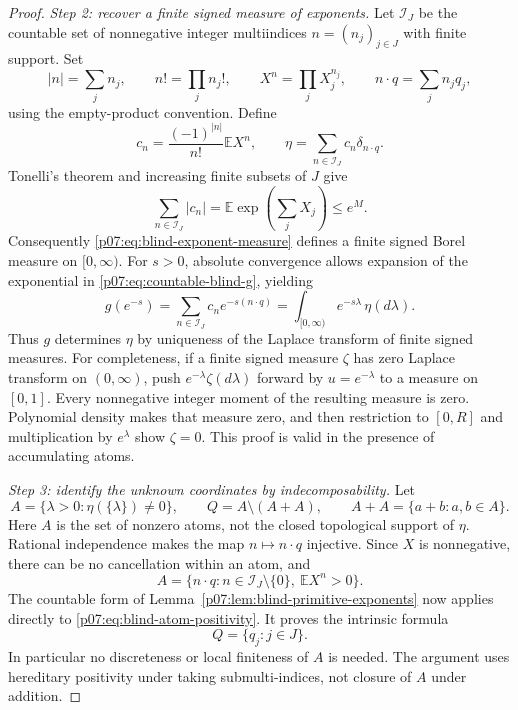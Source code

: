 \documentclass[11pt,letterpaper]{article}
\theoremstyle{definition}
\theoremstyle{remark}
\newcommand{\E}{\mathbb E}
\newcommand{\1}{\mathbf 1}
\begin{document}
\begin{proof}
\emph{Step 2: recover a finite signed measure of exponents.}
Let $\mathcal I_J$ be the countable set of nonnegative integer
multiindices $n=(n_j)_{j\in J}$ with finite support. Set
\[
 |n|=\sum_jn_j,\qquad n!=\prod_jn_j!,\qquad
 X^n=\prod_jX_j^{n_j},\qquad n\cdot q=\sum_jn_jq_j,
\]
using the empty-product convention. Define
\begin{equation}\label{p07:eq:blind-exponent-measure}
 c_n=\frac{(-1)^{|n|}}{n!}\E X^n,
 \qquad
 \eta=\sum_{n\in\mathcal I_J}c_n\delta_{n\cdot q}.
\end{equation}
Tonelli's theorem and increasing finite subsets of $J$ give
\begin{equation}\label{p07:eq:blind-exponent-variation}
 \sum_{n\in\mathcal I_J}|c_n|
   =\E\exp\left(\sum_jX_j\right)\leq e^M.
\end{equation}
Consequently \eqref{p07:eq:blind-exponent-measure} defines a finite signed
Borel measure on $[0,\infty)$. For $s>0$, absolute convergence allows
expansion of the exponential in \eqref{p07:eq:countable-blind-g}, yielding
\begin{equation}\label{p07:eq:blind-exponent-laplace}
 g(e^{-s})
   =\sum_{n\in\mathcal I_J}c_ne^{-s(n\cdot q)}
   =\int_{[0,\infty)}e^{-s\lambda}\,\eta(d\lambda).
\end{equation}
Thus $g$ determines $\eta$ by uniqueness of the Laplace transform of
finite signed measures. For completeness, if a finite signed measure
$\zeta$ has zero Laplace transform on $(0,\infty)$, push
$e^{-\lambda}\zeta(d\lambda)$ forward by $u=e^{-\lambda}$ to a
measure on $[0,1]$. Every nonnegative integer moment of the resulting
measure is zero. Polynomial density makes that measure zero, and then
restriction to $[0,R]$ and multiplication by $e^\lambda$ show
$\zeta=0$. This proof is valid in the presence of accumulating atoms.

\emph{Step 3: identify the unknown coordinates by indecomposability.}
Let
\begin{equation}\label{p07:eq:blind-atom-set}
 A=\{\lambda>0:\eta(\{\lambda\})\ne0\},
 \qquad
 Q=A\setminus(A+A),
 \qquad A+A=\{a+b:a,b\in A\}.
\end{equation}
Here $A$ is the set of nonzero atoms, not the closed topological support
of $\eta$. Rational independence makes the map $n\mapsto n\cdot q$
injective. Since $X$ is nonnegative, there can be no cancellation within
an atom, and
\begin{equation}\label{p07:eq:blind-atom-positivity}
 A=\{n\cdot q:n\in\mathcal I_J\setminus\{0\},\ \E X^n>0\}.
\end{equation}
The countable form of
Lemma~\ref{p07:lem:blind-primitive-exponents} now applies directly to
\eqref{p07:eq:blind-atom-positivity}. It proves the intrinsic formula
\begin{equation}\label{p07:eq:blind-intrinsic-indices}
 Q=\{q_j:j\in J\}.
\end{equation}
In particular no discreteness or local finiteness of $A$ is needed.
The argument uses hereditary positivity under taking submulti-indices,
not closure of $A$ under addition.


\end{proof}
\end{document}
